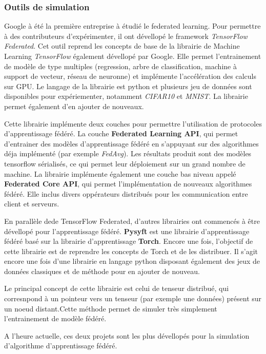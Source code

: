 \documentclass[stage3a]{tnreport} %
\begin{document}
\subsubsection{Outils de simulation}

Google à été la première entreprise à étudié le federated learning. Pour permettre à des contributeurs d'expérimenter, il ont dévellopé le framework \textit{TensorFlow Federated}. Cet outil reprend les concepts de base de la librairie de Machine Learning \textit{TensorFlow} également dévellopé par Google. Elle permet l'entrainement de modèle de type multiples (regression, arbre de classification, machine à support de vecteur, réseau de neuronne) et implémente l'accélération des calculs sur GPU. Le langage de la librairie est python et plusieurs jeu de données sont disponibles pour expériementer, notamment \textit{CIFAR10} et \textit{MNIST}. La librairie permet également d'en ajouter de nouveaux.

Cette librairie implémente deux couches pour permettre l'utilisation de protocoles d'apprentissage fédéré.  
La couche \textbf{Federated Learning API}, qui permet d'entrainer des modèles d'apprentissage fédéré en s'appuyant sur des algorithmes déja implémenté (par exemple \textit{FedAvg}). Les résultats produit sont des modèles tensorflow sérialisés, ce qui permet leur déploiement sur un grand nombre de machine.
La librairie implémente également une couche bas niveau appelé \textbf{Federated Core API}, qui permet l'implémentation de nouveaux algorithmes fédéré. Elle inclus divers oppérateurs distribués pour les communication entre client et serveurs.

En parallèle dede TensorFlow Federated, d'autres librairies ont commencés à être dévellopé pour l'apprentissage fédéré. \textbf{Pysyft} est une librairie d'apprentissage fédéré basé sur la librairie d'apprentissage \textbf{Torch}. Encore une fois, l'objectif de cette librairie est de reprendre les concepts de Torch et de les distribuer. Il s'agit encore une fois d'une librairie en langage python disposant également des jeux de données classiques et de méthode pour en ajouter de nouveau.

Le principal concept de cette librairie est celui de tenseur distribué, qui corresnpond à un pointeur vers un tenseur (par exemple une données) présent sur un noeud distant.Cette méthode permet de simuler très simplement l'entrainement de modèle 
fédéré. 

A l'heure actuelle, ces deux projets sont les plus dévellopés pour la simulation d'algorithme d'apprentissage fédéré. 
\end{document}
